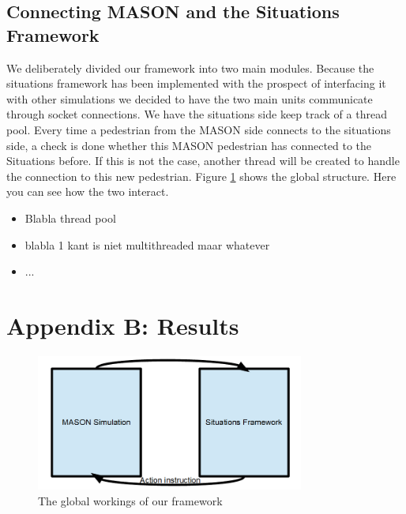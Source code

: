 \documentclass[11pt]{book}
\begin{document}
\subsection{Connecting MASON and the Situations Framework}
We deliberately divided our framework into two main modules. Because the situations framework has been implemented with the prospect of interfacing it with other simulations we decided to have the two main units communicate through socket connections. We have the situations side keep track of a thread pool. Every time a pedestrian from the MASON side connects to the situations side, a check is done whether this MASON pedestrian has connected to the Situations before. If this is not the case, another thread will be created to handle the connection to this new pedestrian.  Figure \ref{framework}  shows the global structure. Here you can see how the two interact.
\begin{itemize}
\item Blabla thread pool
\item blabla 1 kant is niet multithreaded maar whatever
\item ...
\end{itemize}


\section{Appendix B: Results}
\begin{figure}
\centering
\includegraphics[width=250pt]{framework}
\caption{The global workings of our framework}
\label{framework}
\end{figure}






\end{document}
